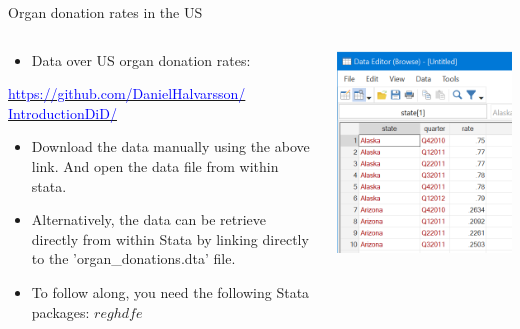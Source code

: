 \documentclass[notes,11pt, aspectratio=169]{beamer}
\begin{document}
\begin{frame}{Organ donation rates in the US}
\begin{columns}
\begin{column}{0.5\textwidth}
  
\begin{itemize}
    \item Data over US organ donation rates:
\end{itemize}

\href{https://github.com/DanielHalvarsson/IntroductionDiD/}{\textcolor{blue}{https://github.com/DanielHalvarsson/\\IntroductionDiD/}}
\begin{itemize}
    \item Download the data manually using the above link. And open the data file from within stata.
    \item Alternatively, the data can be retrieve directly from within Stata by linking directly to the 'organ\_donations.dta' file.
    \item To follow along, you need the following Stata packages: $reghdfe$
\end{itemize}
\end{column}
\begin{column}{0.5\textwidth}
 \begin{center}
        \includegraphics[width=0.7\linewidth]{24_DiDLecture/24_DiDLecture_LoadData.png}
    \end{center}
\end{column}
\end{columns}
\end{frame}
\end{document}
